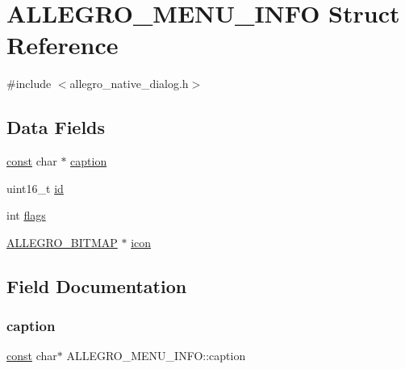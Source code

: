 \hypertarget{struct_a_l_l_e_g_r_o___m_e_n_u___i_n_f_o}{}\section{A\+L\+L\+E\+G\+R\+O\+\_\+\+M\+E\+N\+U\+\_\+\+I\+N\+FO Struct Reference}
\label{struct_a_l_l_e_g_r_o___m_e_n_u___i_n_f_o}


{\ttfamily \#include $<$allegro\+\_\+native\+\_\+dialog.\+h$>$}

\subsection*{Data Fields}
\begin{DoxyCompactItemize}
\item 
\hyperlink{zconf_8h_a2c212835823e3c54a8ab6d95c652660e}{const} char $\ast$ \hyperlink{struct_a_l_l_e_g_r_o___m_e_n_u___i_n_f_o_aa36fea14265c737177d56004bde1a347}{caption}
\item 
uint16\+\_\+t \hyperlink{struct_a_l_l_e_g_r_o___m_e_n_u___i_n_f_o_ae029961cc4b7b93341524b9cab23436c}{id}
\item 
int \hyperlink{struct_a_l_l_e_g_r_o___m_e_n_u___i_n_f_o_ae3e8a6833a2506bf26df79039bc9ef9d}{flags}
\item 
\hyperlink{bitmap_8h_a97651ee6e8e9e81afb7d8b159591839a}{A\+L\+L\+E\+G\+R\+O\+\_\+\+B\+I\+T\+M\+AP} $\ast$ \hyperlink{struct_a_l_l_e_g_r_o___m_e_n_u___i_n_f_o_af709d644791652f8bbf02a69f62bdf04}{icon}
\end{DoxyCompactItemize}


\subsection{Field Documentation}
\mbox{\label{struct_a_l_l_e_g_r_o___m_e_n_u___i_n_f_o_aa36fea14265c737177d56004bde1a347}} 
\subsubsection{\texorpdfstring{caption}{caption}}
{\footnotesize\ttfamily \hyperlink{zconf_8h_a2c212835823e3c54a8ab6d95c652660e}{const} char$\ast$ A\+L\+L\+E\+G\+R\+O\+\_\+\+M\+E\+N\+U\+\_\+\+I\+N\+F\+O\+::caption}

